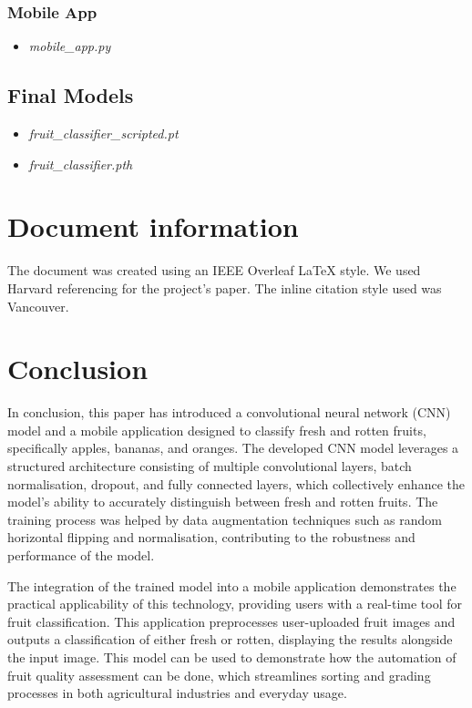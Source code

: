 \documentclass[conference]{IEEEtran}
\begin{document}
\subsubsection{Mobile App}
\begin{itemize}
    \item \textit{mobile\_app.py}
\end{itemize}

\subsection{Final Models}
\begin{itemize}
    \item \textit{fruit\_classifier\_scripted.pt}
    \item \textit{fruit\_classifier.pth}
\end{itemize}


\section{Document information}
The document was created using an IEEE Overleaf LaTeX style.  We used Harvard referencing for the project's paper. The inline citation style used was Vancouver.

\section{Conclusion}

In conclusion, this paper has introduced a convolutional neural network (CNN) model and a mobile application designed to classify fresh and rotten fruits, specifically apples, bananas, and oranges. The developed CNN model leverages a structured architecture consisting of multiple convolutional layers, batch normalisation, dropout, and fully connected layers, which collectively enhance the model's ability to accurately distinguish between fresh and rotten fruits. The training process was helped  by data augmentation techniques such as random horizontal flipping and normalisation, contributing to the robustness and performance of the model.

The integration of the trained model into a mobile application demonstrates the practical applicability of this technology, providing users with a real-time tool for fruit classification. This application preprocesses user-uploaded fruit images and outputs a classification of either fresh or rotten, displaying the results alongside the input image. This model can be used to demonstrate how the automation of fruit quality assessment can be done, which streamlines sorting and grading processes in both agricultural industries and everyday usage.
\end{document}

